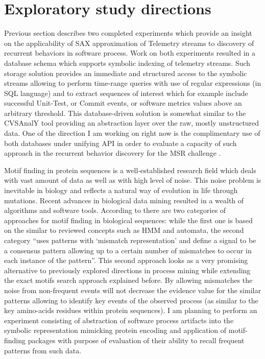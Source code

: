 \documentclass{sig-alternate}
\begin{document}
\section{Exploratory study directions}
Previous section describes two completed experiments which provide an insight on the applicability of SAX approximation of Telemetry streams to discovery of recurrent behaviors in software process. Work on both experiments resulted in a database schema which supports symbolic indexing of telemetry streams. Such storage solution provides an immediate and structured access to the symbolic streams allowing to perform time-range queries with use of regular expressions (in SQL language) and to extract sequences of interest which for example include successful Unit-Test, or Commit events, or software metrics values above an arbitrary threshold. This database-driven solution is somewhat similar to the CVSAnalY tool \cite{citeulike:6544724} providing an abstraction layer over the raw, mostly unstructured data. One of the direction I am working on right now is the complimentary use of both databases under unifying API in order to evaluate a capacity of such approach in the recurrent behavior discovery for the MSR challenge \cite{citeulike:5043676}.

Motif finding in protein sequences is a well-established research field which deals with vast amount of data as well as with high level of noise. This noise problem is inevitable in biology and reflects a natural way of evolution in life through mutations. Recent advances in biological data mining resulted in a wealth of algorithms and software tools.  According to \cite{citeulike:964046} there are two categories of approaches for motif finding in biological sequences: while the first one is based on the similar to reviewed concepts such as HMM and automata, the second category ``uses patterns with `mismatch representation' and define a signal to be a consensus pattern allowing up to a certain number of mismatches to occur in each instance of the pattern''. This second approach looks as a very promising alternative to previously explored directions in process mining while extending the exact motifs search approach explained before. By allowing mismatches the noise from non-frequent events will not decrease the evidence value for the similar patterns allowing to identify key events of the observed process (as similar to the key amino-acids residues within protein sequences). I am planning to perform an experiment consisting of abstraction of software process artifacts into the symbolic representation mimicking protein encoding and application of motif-finding packages with purpose of evaluation of their ability to recall frequent patterns from such data.
\end{document}
